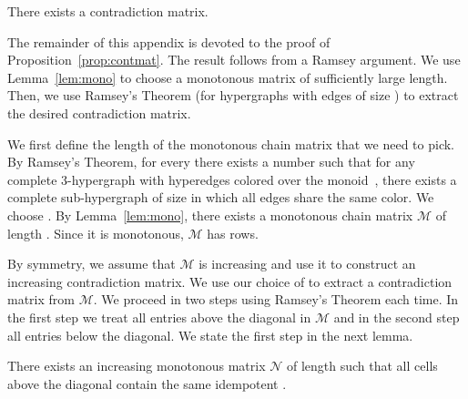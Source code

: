 \documentclass[envcountsame]{llncs}
\newcommand\mat{\ensuremath{\mathscr{M}}\xspace}
\newcommand\mnat{\ensuremath{\mathscr{N}}\xspace}
\newcommand\chain{chain\xspace}
\begin{document}
\begin{proposition} \label{prop:contmat}
  There exists a contradiction matrix.
\end{proposition}

The remainder of this appendix is devoted to the proof of
Proposition~\ref{prop:contmat}. The result follows from a Ramsey
argument. We use Lemma~\ref{lem:mono} to choose a monotonous matrix of
sufficiently large length. Then, we use Ramsey's Theorem (for
hypergraphs with edges of size ) to extract the desired
contradiction matrix.

We first define the length of the monotonous \chain matrix that we need to
pick. By Ramsey's Theorem, for every  there exists a number
 such that for any complete 3-hypergraph with hyperedges colored
over the monoid~, there exists a complete sub-hypergraph of size  in
which all edges share the same color. We choose . By Lemma~\ref{lem:mono}, there exists a monotonous
\chain matrix \mat of length . Since it is monotonous, \mat has  rows.

By symmetry, we assume that \mat is increasing and use it to construct an
increasing contradiction matrix.  We use our choice of  to extract a
contradiction matrix from \mat. We proceed in two steps using Ramsey's Theorem
each time. In the first step we treat all entries above the diagonal in \mat
and in the second step all entries below the diagonal. We state the first step
in the next lemma.

\begin{lemma} \label{lem:matlemma}
  There exists an increasing monotonous matrix \mnat of length  such that all cells above the diagonal contain the same
  idempotent .
\end{lemma}
\end{document}
